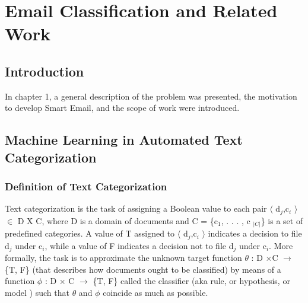 \newenvironment{my_itemize}
{\begin{itemize}
  \setlength{\itemsep}{0cm}
  \setlength{\parskip}{0cm}}
{\end{itemize}}
\newenvironment{my_enumerate}
{\begin{enumerate}
  \setlength{\itemsep}{0cm}
  \setlength{\parskip}{0cm}}
{\end{enumerate}}

\chapter{Email Classification and Related Work} %

\label{Chapter2} %



\section{Introduction}
In chapter 1, a general description of the problem was presented, the motivation to develop Smart Email, and the scope of work were introduced.


\section{Machine Learning in Automated Text Categorization}
\subsection{Definition of Text Categorization}
Text categorization is the task of assigning a Boolean value to each pair $\langle$ d$_{j}$,c$_{i}$ $\rangle$ $\in$ D X C,  where D is a domain of documents and C = \{c$_{1}$, . . . , c $_{|C|}$\} is a set of predefined categories. A value of T assigned to $\langle$ d$_{j}$,c$_{i}$ $\rangle$ indicates a decision to file d$_{j}$ under c$_{i}$, while a value of F indicates a decision not to file d$_{j}$ under c$_{i}$. More formally, the task is to approximate the unknown target function $\theta$ : D ×C $\rightarrow$ \{T, F\} (that describes how documents ought to be classified) by means of a function $\phi$ : D × C $\rightarrow$ \{T, F\} called the classifier (aka rule, or hypothesis, or model ) such that $\theta$ and $\phi$ coincide as much as possible.\cite{Sebastiani2002}

